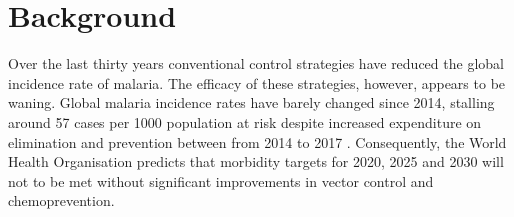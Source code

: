 \documentclass[]{bmcart}
\begin{document}
\begin{frontmatter}
\begin{abstractbox}
\begin{keyword}
\end{keyword}


\end{abstractbox}
%

\end{frontmatter}



\section{Background}
Over the last thirty years conventional control strategies have reduced the global incidence rate of malaria. The efficacy of these strategies, however, appears to be waning. Global malaria incidence rates have barely changed since 2014, stalling around 57 cases per 1000 population at risk despite increased expenditure on elimination and prevention between from 2014 to 2017 \citep{WHO2019}. Consequently, the World Health Organisation predicts that morbidity targets for 2020, 2025 and 2030 will not to be met without significant improvements in vector control and chemoprevention.
\end{document}
